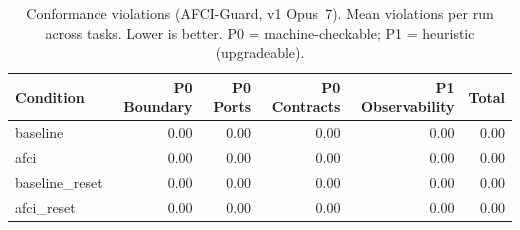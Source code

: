 \begin{table}[t]
\centering
\caption{Conformance violations (AFCI-Guard, v1 Opus~7). Mean violations per run across tasks. Lower is better. P0 = machine-checkable; P1 = heuristic (upgradeable).}
\label{tab:conformance-v1}
\footnotesize
\setlength{\tabcolsep}{4pt}
\renewcommand{\arraystretch}{1.05}
\begin{tabular}{lrrrrr}
\toprule
Condition & P0 Boundary & P0 Ports & P0 Contracts & P1 Observability & Total \\
\midrule
  baseline & 0.00 & 0.00 & 0.00 & 0.00 & 0.00 \\
  afci & 0.00 & 0.00 & 0.00 & 0.00 & 0.00 \\
  baseline\_reset & 0.00 & 0.00 & 0.00 & 0.00 & 0.00 \\
  afci\_reset & 0.00 & 0.00 & 0.00 & 0.00 & 0.00 \\
\bottomrule
\end{tabular}
\end{table}
